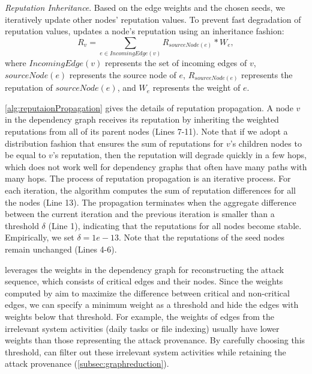 \emph{Reputation Inheritance}.
Based on the edge weights and the chosen seeds, we iteratively update other nodes' reputation values. 
To prevent fast degradation of reputation values, \tool updates a node's reputation using an inheritance fashion:  
\begin{equation}
    \label{eq:reputation}
     R_{v} =\sum_{e \in IncomingEdge(v)} R_{sourceNode(e)}*W_e,
\end{equation}
where $IncomingEdge(v)$ represents the set of incoming edges of $v$, $sourceNode(e)$ represents the source node of $e$, $R_{sourceNode(e)}$ represents the reputation of $sourceNode(e)$, and $W_e$ represents the weight of $e$.




\cref{alg:reputaionPropagation} gives the details of reputation propagation. 
A node $v$ in the dependency graph receives its reputation by inheriting the weighted reputations from all of its parent nodes (Lines 7-11).
Note that if we adopt a distribution fashion that ensures the sum of reputations for $v$'s children nodes to be equal to $v$'s reputation,
then the reputation will degrade quickly in a few hops, which does not work well for dependency graphs that often have many paths with many hops.
%
The process of reputation propagation is an iterative process.
For each iteration, the algorithm computes the sum of reputation differences for all the nodes (Line 13).
The propagation terminates when the aggregate difference between the current iteration and the previous iteration is smaller than a threshold $\delta$ (Line 1), indicating that the reputations for all nodes become stable.
Empirically, we set $\delta = 1e-13$.
Note that the reputations of the seed nodes remain unchanged (Lines 4-6).


\tool leverages the weights in the dependency graph for reconstructing the attack sequence, which consists of critical edges and their nodes.
Since the weights computed by \tool aim to maximize the difference between critical and non-critical edges, we can specify a minimum weight as a threshold and hide the edges with weights below that threshold.
For example, the weights of edges from the irrelevant system activities (\eg daily tasks or file indexing) usually have lower weights than those representing the attack provenance.
By carefully choosing this threshold, \tool can filter out these irrelevant system activities while retaining the attack provenance (\cref{subsec:graphreduction}).

